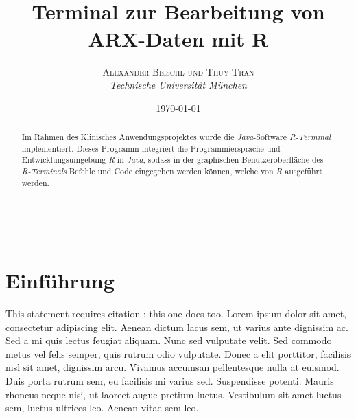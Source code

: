 \documentclass[a4paper, 12pt]{report} %
\title{\textbf{}\\ %
Terminal zur Bearbeitung von ARX-Daten mit R} %
\author{\textsc{Alexander Beischl und Thuy Tran} %
\\{\textit{Technische Universität München}}} %
\date{\today} %
\makeatletter
\renewcommand{\maketitle}{ %
\begin{flushright} %
{\LARGE\@title} %

\vspace{50pt} %

{\large\@author} %
\\\@date %

\vspace{40pt} %
\end{flushright}
}
\makeatother
\begin{document}
\renewcommand\lstlistingname{R-Befehl}

\maketitle %


\renewcommand{\abstractname}{Zusammenfassung} %

\begin{abstract}

Im Rahmen des Klinisches Anwendungsprojektes wurde die \textit{Java}-Software \textit{R-Terminal} implementiert. Dieses Programm integriert die Programmiersprache und Entwicklungsumgebung \textit{R} in \textit{Java}, sodass in der graphischen Benutzeroberfläche des \textit{R-Terminals} Befehle und Code eingegeben werden können, welche von \textit{R} ausgeführt werden. 

\end{abstract}


\vspace{30pt} %

\tableofcontents



\chapter{Einführung}\label{einführung}

This statement requires citation \cite{latexcompanion}; this one does too. Lorem ipsum dolor sit amet, consectetur adipiscing elit. Aenean dictum lacus sem, ut varius ante dignissim ac. Sed a mi quis lectus feugiat aliquam. Nunc sed vulputate velit. Sed commodo metus vel felis semper, quis rutrum odio vulputate. Donec a elit porttitor, facilisis nisl sit amet, dignissim arcu. Vivamus accumsan pellentesque nulla at euismod. Duis porta rutrum sem, eu facilisis mi varius sed. Suspendisse potenti. Mauris rhoncus neque nisi, ut laoreet augue pretium luctus. Vestibulum sit amet luctus sem, luctus ultrices leo. Aenean vitae sem leo.
\end{document}
